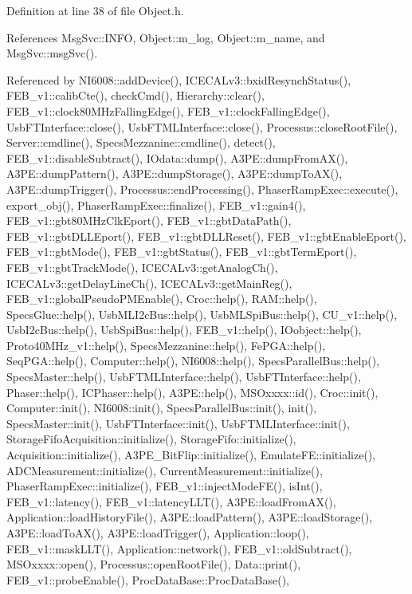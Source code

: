 Definition at line 38 of file Object.\+h.



References Msg\+Svc\+::\+I\+N\+FO, Object\+::m\+\_\+log, Object\+::m\+\_\+name, and Msg\+Svc\+::msg\+Svc().



Referenced by N\+I6008\+::add\+Device(), I\+C\+E\+C\+A\+Lv3\+::bxid\+Resynch\+Status(), F\+E\+B\+\_\+v1\+::calib\+Cte(), check\+Cmd(), Hierarchy\+::clear(), F\+E\+B\+\_\+v1\+::clock80\+M\+Hz\+Falling\+Edge(), F\+E\+B\+\_\+v1\+::clock\+Falling\+Edge(), Usb\+F\+T\+Interface\+::close(), Usb\+F\+T\+M\+L\+Interface\+::close(), Processus\+::close\+Root\+File(), Server\+::cmdline(), Specs\+Mezzanine\+::cmdline(), detect(), F\+E\+B\+\_\+v1\+::disable\+Subtract(), I\+Odata\+::dump(), A3\+P\+E\+::dump\+From\+A\+X(), A3\+P\+E\+::dump\+Pattern(), A3\+P\+E\+::dump\+Storage(), A3\+P\+E\+::dump\+To\+A\+X(), A3\+P\+E\+::dump\+Trigger(), Processus\+::end\+Processing(), Phaser\+Ramp\+Exec\+::execute(), export\+\_\+obj(), Phaser\+Ramp\+Exec\+::finalize(), F\+E\+B\+\_\+v1\+::gain4(), F\+E\+B\+\_\+v1\+::gbt80\+M\+Hz\+Clk\+Eport(), F\+E\+B\+\_\+v1\+::gbt\+Data\+Path(), F\+E\+B\+\_\+v1\+::gbt\+D\+L\+L\+Eport(), F\+E\+B\+\_\+v1\+::gbt\+D\+L\+L\+Reset(), F\+E\+B\+\_\+v1\+::gbt\+Enable\+Eport(), F\+E\+B\+\_\+v1\+::gbt\+Mode(), F\+E\+B\+\_\+v1\+::gbt\+Status(), F\+E\+B\+\_\+v1\+::gbt\+Term\+Eport(), F\+E\+B\+\_\+v1\+::gbt\+Track\+Mode(), I\+C\+E\+C\+A\+Lv3\+::get\+Analog\+Ch(), I\+C\+E\+C\+A\+Lv3\+::get\+Delay\+Line\+Ch(), I\+C\+E\+C\+A\+Lv3\+::get\+Main\+Reg(), F\+E\+B\+\_\+v1\+::global\+Pseudo\+P\+M\+Enable(), Croc\+::help(), R\+A\+M\+::help(), Specs\+Glue\+::help(), Usb\+M\+L\+I2c\+Bus\+::help(), Usb\+M\+L\+Spi\+Bus\+::help(), C\+U\+\_\+v1\+::help(), Usb\+I2c\+Bus\+::help(), Usb\+Spi\+Bus\+::help(), F\+E\+B\+\_\+v1\+::help(), I\+Oobject\+::help(), Proto40\+M\+Hz\+\_\+v1\+::help(), Specs\+Mezzanine\+::help(), Fe\+P\+G\+A\+::help(), Seq\+P\+G\+A\+::help(), Computer\+::help(), N\+I6008\+::help(), Specs\+Parallel\+Bus\+::help(), Specs\+Master\+::help(), Usb\+F\+T\+M\+L\+Interface\+::help(), Usb\+F\+T\+Interface\+::help(), Phaser\+::help(), I\+C\+Phaser\+::help(), A3\+P\+E\+::help(), M\+S\+Oxxxx\+::id(), Croc\+::init(), Computer\+::init(), N\+I6008\+::init(), Specs\+Parallel\+Bus\+::init(), init(), Specs\+Master\+::init(), Usb\+F\+T\+Interface\+::init(), Usb\+F\+T\+M\+L\+Interface\+::init(), Storage\+Fifo\+Acquisition\+::initialize(), Storage\+Fifo\+::initialize(), Acquisition\+::initialize(), A3\+P\+E\+\_\+\+Bit\+Flip\+::initialize(), Emulate\+F\+E\+::initialize(), A\+D\+C\+Measurement\+::initialize(), Current\+Measurement\+::initialize(), Phaser\+Ramp\+Exec\+::initialize(), F\+E\+B\+\_\+v1\+::inject\+Mode\+F\+E(), is\+Int(), F\+E\+B\+\_\+v1\+::latency(), F\+E\+B\+\_\+v1\+::latency\+L\+L\+T(), A3\+P\+E\+::load\+From\+A\+X(), Application\+::load\+History\+File(), A3\+P\+E\+::load\+Pattern(), A3\+P\+E\+::load\+Storage(), A3\+P\+E\+::load\+To\+A\+X(), A3\+P\+E\+::load\+Trigger(), Application\+::loop(), F\+E\+B\+\_\+v1\+::mask\+L\+L\+T(), Application\+::network(), F\+E\+B\+\_\+v1\+::old\+Subtract(), M\+S\+Oxxxx\+::open(), Processus\+::open\+Root\+File(), Data\+::print(), F\+E\+B\+\_\+v1\+::probe\+Enable(), Proc\+Data\+Base\+::\+Proc\+Data\+Base(), 